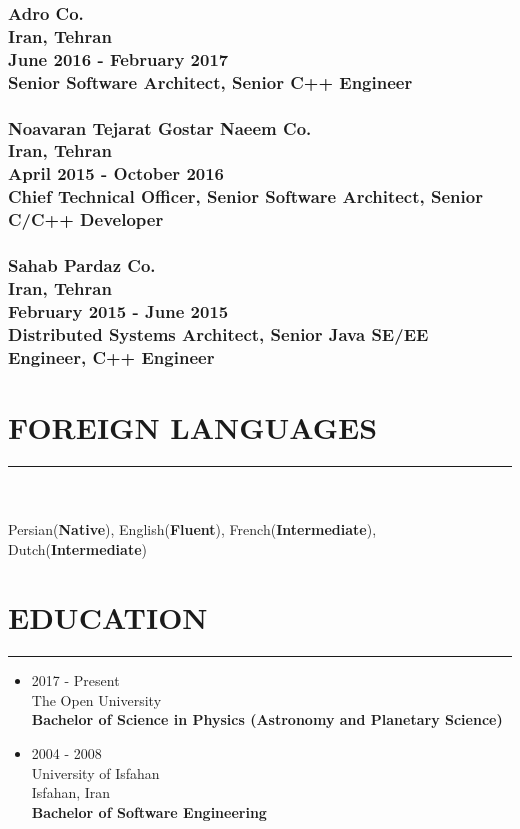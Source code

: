 \documentclass[10pt,a4paper]{article}
\begin{document}
\subsubsection{{\large Adro Co.} \\
\textnormal{Iran, Tehran} \\
\textnormal{June 2016 - February 2017} \\
{Senior Software Architect, Senior C++ Engineer}}
\vspace{0.3cm}

\subsubsection{{\large Noavaran Tejarat Gostar Naeem Co.} \\
\textnormal{Iran, Tehran} \\
\textnormal{April 2015 - October 2016} \\
{Chief Technical Officer, Senior Software Architect, Senior C/C++ Developer}}
\vspace{0.3cm}

\subsubsection{{\large Sahab Pardaz Co.} \\
\textnormal{Iran, Tehran} \\
\textnormal{February 2015 - June 2015} \\
{Distributed Systems Architect, Senior Java SE/EE Engineer, C++ Engineer}}
\hfill


\section{FOREIGN LANGUAGES}
\noindent \rule {5.5cm}{0.4pt} \\ \\
    Persian(\textbf{Native}),
    English(\textbf{Fluent}),
    French(\textbf{Intermediate}),
    Dutch(\textbf{Intermediate}) \\

\section{EDUCATION}
\noindent \rule {3.0cm}{0.4pt}
  \begin{itemize}
    \item \small {2017 - Present \\
                  The Open University \\
                  \textbf{Bachelor of Science in Physics (Astronomy and Planetary Science) }}
  \end{itemize}
  \begin{itemize}
    \item \small {2004 - 2008 \\
                  University of Isfahan \\
                  Isfahan, Iran \\
                  \textbf{Bachelor of Software Engineering}}
  \end{itemize}
\end{document}
